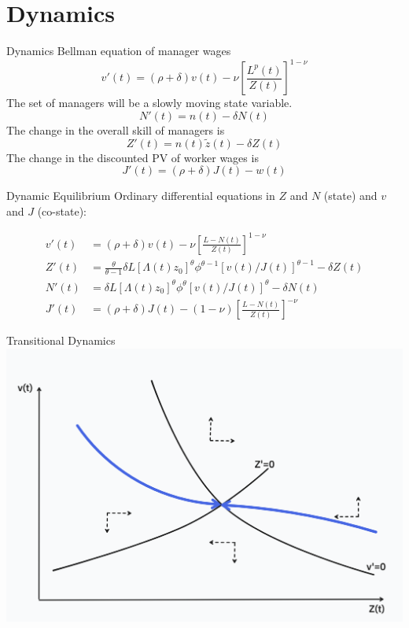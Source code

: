\documentclass[
  ignorenonframetext,
  aspectratio=1610,
]{beamer}
\let\oldsection\section
\renewcommand{\section}{
  \addtocounter{framenumber}{-1} %
  \oldsection
}
\begin{document}
\section{Dynamics}\label{dynamics}

\begin{frame}{Dynamics}
\protect\hypertarget{dynamics-1}{}
Bellman equation of manager wages
\[v'(t) = (\rho+\delta) v(t) - \nu \left[\frac {L^{p}(t)}{Z(t)}\right]^{1-\nu}\]
The set of managers will be a slowly moving state variable.
\[N'(t) = n(t) - \delta N(t)\] The change in the overall skill of
managers is \[Z'(t) = n(t)\tilde z(t) - \delta Z(t)\] The change in the
discounted PV of worker wages is \[J'(t)=(\rho+\delta)J(t)-w(t)\]
\end{frame}

\begin{frame}{Dynamic Equilibrium}
\protect\hypertarget{dynamic-equilibrium}{}
Ordinary differential equations in \(Z\) and \(N\) (state) and \(v\) and
\(J\) (co-state):

\begin{align*}
v'(t) &= (\rho+\delta) v(t) - \nu \left[\frac {L - N(t)}{Z(t)}\right]^{1-\nu} \\
Z'(t) &= \frac{\theta}{\theta-1} \delta L [\Lambda(t)z_0]^\theta \phi^{\theta-1} [v(t)/J(t)]^{\theta-1} - \delta Z(t) \\
N'(t) &= \delta L [\Lambda(t)z_0]^\theta \phi^{\theta} [v(t)/J(t)]^\theta - \delta N(t) \\
J'(t) &= (\rho+\delta) J(t) - (1-\nu) \left[\frac {L - N(t)}{Z(t)}\right]^{-\nu}
\end{align*}
\end{frame}

\begin{frame}{Transitional Dynamics}
\protect\hypertarget{transitional-dynamics}{}
\includegraphics{fig/phase1.png}
\end{frame}
\end{document}
